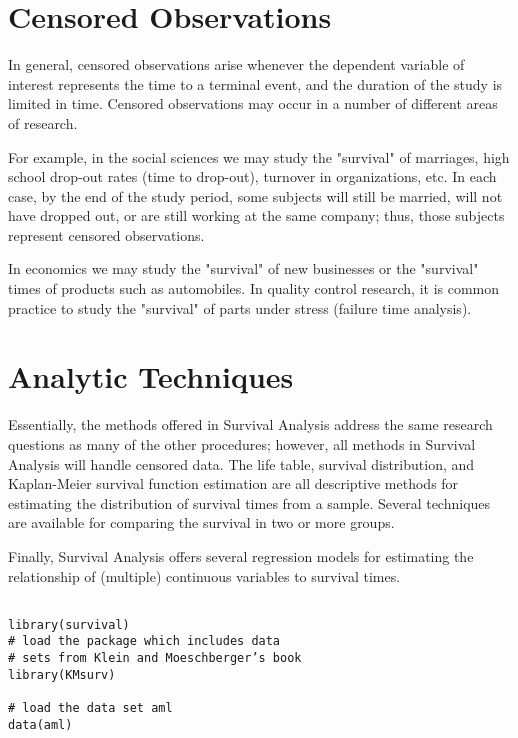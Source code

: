 \documentclass[11pt]{article} %
\begin{document}
\newpage
\section{Censored Observations}

In general, censored observations arise whenever the dependent variable of interest represents the time to a terminal event, and the duration of the study is limited in time. Censored observations may occur in a number of different areas of research. 

For example, in the social sciences we may study the "survival" of marriages, high school drop-out rates (time to drop-out), turnover in organizations, etc. In each case, by the end of the study period, some subjects will still be married, will not have dropped out, or are still working at the same company; thus, those subjects represent censored observations.

In economics we may study the "survival" of new businesses or the "survival" times of products such as automobiles. In quality control research, it is common practice to study the "survival" of parts under stress (failure time analysis).


\section{Analytic Techniques}

Essentially, the methods offered in Survival Analysis address the same research questions as many of the other procedures; however, all methods in Survival Analysis will handle censored data. The life table, survival distribution, and Kaplan-Meier survival function estimation are all descriptive methods for estimating the distribution of survival times from a sample. Several techniques are available for comparing the survival in two or more groups. 

Finally, Survival Analysis offers several regression models for estimating the relationship of (multiple) continuous variables to survival times.

\newpage

\begin{framed}
\begin{verbatim}

library(survival) 
# load the package which includes data
# sets from Klein and Moeschberger’s book
library(KMsurv) 

# load the data set aml 
data(aml) 

\end{verbatim}
\end{framed}
\end{document}
